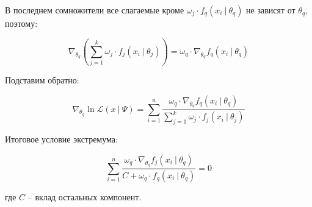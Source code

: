 \documentclass[14pt, a4paper, oneside]{memoir}
\begin{document}
В последнем сомножители все слагаемые кроме $\omega_j \cdot f_q(x_i~|~ \theta_q)$ не зависят от $\theta_q$, поэтому:

\[\nabla_{\theta_q} \left(\sum_{j=1}^k \omega_j \cdot f_j(x_i~|~ \theta_j) \right) = \omega_q \cdot \nabla_{\theta_q} f_q(x_i ~|~ \theta_q)\]

Подставим обратно:

\[\nabla_{\theta_q} \ln \mathcal{L}(x ~|~ \Psi) = \sum_{i=1}^n \frac{\omega_q \cdot \nabla_{\theta_q} f_q(x_i ~|~ \theta_q)}{\sum_{j=1}^k\omega_j \cdot f_j(x_i~|~ \theta_j)}\]

Итоговое условие экстремума:

\[\sum_{i=1}^n \frac{\omega_q \cdot \nabla_{\theta_q} f_j(x_i ~|~\theta_q)}{C + \omega_q \cdot f_q(x_i~|~ \theta_q)} = 0\]

где $C$ -- вклад остальных компонент.
\end{document}
